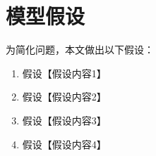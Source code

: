 
\section{模型假设}

为简化问题，本文做出以下假设：

\begin{enumerate}
\item 假设【假设内容1】
\item 假设【假设内容2】
\item 假设【假设内容3】
\item 假设【假设内容4】
\end{enumerate}
